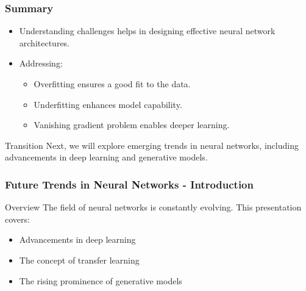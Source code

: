 \documentclass[aspectratio=169]{beamer}
\begin{document}
\begin{frame}[fragile]
    \frametitle{Summary}
    
    \begin{itemize}
        \item Understanding challenges helps in designing effective neural network architectures.
        \item Addressing:
        \begin{itemize}
            \item Overfitting ensures a good fit to the data.
            \item Underfitting enhances model capability.
            \item Vanishing gradient problem enables deeper learning.
        \end{itemize}
    \end{itemize}
    
    \begin{block}{Transition}
        Next, we will explore emerging trends in neural networks, including advancements in deep learning and generative models.
    \end{block}
\end{frame}

\begin{frame}[fragile]
    \frametitle{Future Trends in Neural Networks - Introduction}
    \begin{block}{Overview}
        The field of neural networks is constantly evolving. This presentation covers:
        \begin{itemize}
            \item Advancements in deep learning
            \item The concept of transfer learning
            \item The rising prominence of generative models
        \end{itemize}
    \end{block}
\end{frame}
\end{document}
